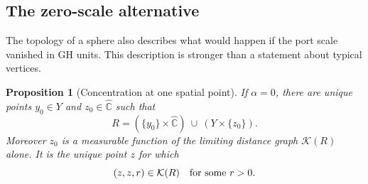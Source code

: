 \documentclass[11pt]{article}
\numberwithin{equation}{section}
\newtheorem{proposition}[theorem]{Proposition}
\theoremstyle{definition}
\theoremstyle{remark}
\newcommand{\Chat}{\widehat{\mathbb C}}
\newcommand{\1}{\mathbf 1}
\begin{document}
\subsection{The zero-scale alternative}

The topology of a sphere also describes what would happen if the
port scale vanished in GH units.  This description is stronger than
a statement about typical vertices.

\begin{proposition}[Concentration at one spatial point]
\label{comp:concentration}
If $\alpha=0$, there are unique points $y_0\in Y$ and $z_0\in\Chat$
such that
\begin{equation}
 \label{comp:cross-relation}
 R=(\{y_0\}\times\Chat)\ \cup\ (Y\times\{z_0\}).
\end{equation}
Moreover $z_0$ is a measurable function of the limiting distance
graph $\mathcal K(R)$ alone.  It is the unique point $z$ for which
\begin{equation}
 \label{comp:positive-diagonal}
 (z,z,r)\in\mathcal K(R)\quad\hbox{for some }r>0.
\end{equation}
\end{proposition}
\end{document}
